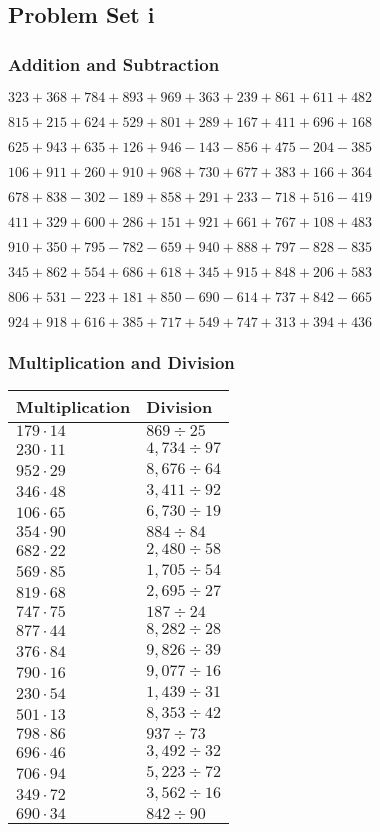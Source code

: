 \hypertarget{problem-set-i}{%
\subsection{Problem Set i}\label{problem-set-i}}

\hypertarget{addition-and-subtraction-161}{%
\subsubsection{Addition and
Subtraction}\label{addition-and-subtraction-161}}

\(323 + 368 + 784 + 893 + 969 + 363 + 239 + 861 + 611 + 482\)

\(815 + 215 + 624 + 529 + 801 + 289 + 167 + 411 + 696 + 168\)

\(625 + 943 + 635 + 126 + 946 - 143 - 856 + 475 - 204 - 385\)

\(106 + 911 + 260 + 910 + 968 + 730 + 677 + 383 + 166 + 364\)

\(678 + 838 - 302 - 189 + 858 + 291 + 233 - 718 + 516 - 419\)

\(411 + 329 + 600 + 286 + 151 + 921 + 661 + 767 + 108 + 483\)

\(910 + 350 + 795 - 782 - 659 + 940 + 888 + 797 - 828 - 835\)

\(345 + 862 + 554 + 686 + 618 + 345 + 915 + 848 + 206 + 583\)

\(806 + 531 - 223 + 181 + 850 - 690 - 614 + 737 + 842 - 665\)

\(924 + 918 + 616 + 385 + 717 + 549 + 747 + 313 + 394 + 436\)

\hypertarget{multiplication-and-division-160}{%
\subsubsection{Multiplication and
Division}\label{multiplication-and-division-160}}

\begin{longtable}[]{@{}ll@{}}
\toprule
Multiplication & Division\tabularnewline
\midrule
\endhead
\(179 \cdot 14\) & \(869÷25\)\tabularnewline
\(230 \cdot 11\) & \(4,734÷97\)\tabularnewline
\(952 \cdot 29\) & \(8,676÷64\)\tabularnewline
\(346 \cdot 48\) & \(3,411÷92\)\tabularnewline
\(106 \cdot 65\) & \(6,730÷19\)\tabularnewline
\(354 \cdot 90\) & \(884÷84\)\tabularnewline
\(682 \cdot 22\) & \(2,480÷58\)\tabularnewline
\(569 \cdot 85\) & \(1,705÷54\)\tabularnewline
\(819 \cdot 68\) & \(2,695÷27\)\tabularnewline
\(747 \cdot 75\) & \(187÷24\)\tabularnewline
\(877 \cdot 44\) & \(8,282÷28\)\tabularnewline
\(376 \cdot 84\) & \(9,826÷39\)\tabularnewline
\(790 \cdot 16\) & \(9,077÷16\)\tabularnewline
\(230 \cdot 54\) & \(1,439÷31\)\tabularnewline
\(501 \cdot 13\) & \(8,353÷42\)\tabularnewline
\(798 \cdot 86\) & \(937÷73\)\tabularnewline
\(696 \cdot 46\) & \(3,492÷32\)\tabularnewline
\(706 \cdot 94\) & \(5,223÷72\)\tabularnewline
\(349 \cdot 72\) & \(3,562÷16\)\tabularnewline
\(690 \cdot 34\) & \(842÷90\)\tabularnewline
\bottomrule
\end{longtable}

